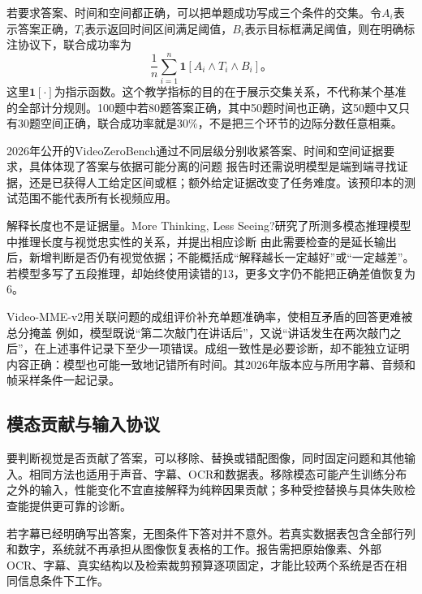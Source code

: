 若要求答案、时间和空间都正确，可以把单题成功写成三个条件的交集。令$A_i$表示答案正确，$T_i$表示返回时间区间满足阈值，$B_i$表示目标框满足阈值，则在明确标注协议下，联合成功率为
\begin{equation}
  \frac1n\sum_{i=1}^{n}\bm 1[A_i\land T_i\land B_i]\text{。}
  \label{eq:vision-grounded-success}
\end{equation}
这里$\bm1[\cdot]$为指示函数。这个教学指标的目的在于展示交集关系，不代称某个基准的全部计分规则。100题中若80题答案正确，其中50题时间也正确，这50题中又只有30题空间正确，联合成功率就是30\%，不是把三个环节的边际分数任意相乘。

2026年公开的VideoZeroBench通过不同层级分别收紧答案、时间和空间证据要求，具体体现了答案与依据可能分离的问题
报告时还需说明模型是端到端寻找证据，还是已获得人工给定区间或框；额外给定证据改变了任务难度。该预印本的测试范围不能代表所有长视频应用。

解释长度也不是证据量。More Thinking, Less Seeing?研究了所测多模态推理模型中推理长度与视觉忠实性的关系，并提出相应诊断
由此需要检查的是延长输出后，新增判断是否仍有视觉依据；不能概括成“解释越长一定越好”或“一定越差”。若模型多写了五段推理，却始终使用读错的13，更多文字仍不能把正确差值恢复为6。

Video-MME-v2用关联问题的成组评价补充单题准确率，使相互矛盾的回答更难被总分掩盖
例如，模型既说“第二次敲门在讲话后”，又说“讲话发生在两次敲门之后”，在上述事件记录下至少一项错误。成组一致性是必要诊断，却不能独立证明内容正确：模型也可能一致地记错所有时间。其2026年版本应与所用字幕、音频和帧采样条件一起记录。

\subsection{模态贡献与输入协议}
\label{sec:vision-understanding-input-protocol}

要判断视觉是否贡献了答案，可以移除、替换或错配图像，同时固定问题和其他输入。相同方法也适用于声音、字幕、OCR和数据表。移除模态可能产生训练分布之外的输入，性能变化不宜直接解释为纯粹因果贡献；多种受控替换与具体失败检查能提供更可靠的诊断。

若字幕已经明确写出答案，无图条件下答对并不意外。若真实数据表包含全部行列和数字，系统就不再承担从图像恢复表格的工作。报告需把原始像素、外部OCR、字幕、真实结构以及检索裁剪预算逐项固定，才能比较两个系统是否在相同信息条件下工作。

